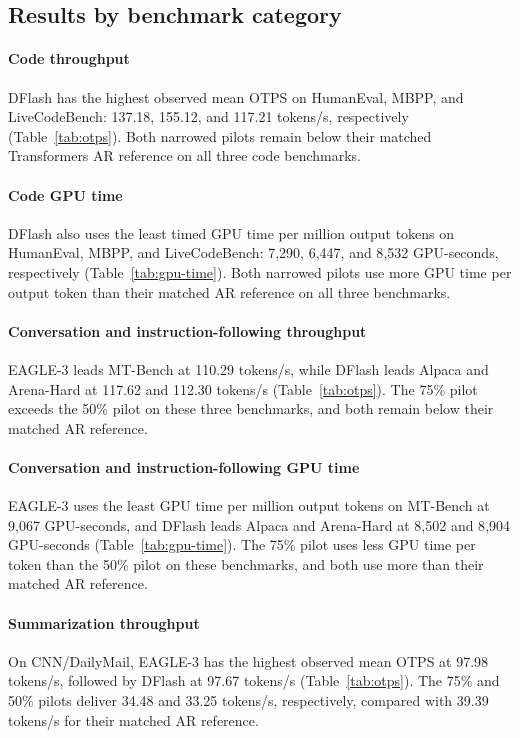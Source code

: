 \documentclass[conference,onecolumn]{IEEEtran}
\begin{document}
\subsection{Results by benchmark category}
\paragraph*{Code throughput}
DFlash has the highest observed mean OTPS on HumanEval, MBPP, and LiveCodeBench: 137.18, 155.12, and 117.21 tokens/s, respectively (Table~\ref{tab:otps}). Both narrowed pilots remain below their matched Transformers AR reference on all three code benchmarks.

\paragraph*{Code GPU time}
DFlash also uses the least timed GPU time per million output tokens on HumanEval, MBPP, and LiveCodeBench: 7{,}290, 6{,}447, and 8{,}532 GPU-seconds, respectively (Table~\ref{tab:gpu-time}). Both narrowed pilots use more GPU time per output token than their matched AR reference on all three benchmarks.

\paragraph*{Conversation and instruction-following throughput}
EAGLE-3 leads MT-Bench at 110.29 tokens/s, while DFlash leads Alpaca and Arena-Hard at 117.62 and 112.30 tokens/s (Table~\ref{tab:otps}). The 75\% pilot exceeds the 50\% pilot on these three benchmarks, and both remain below their matched AR reference.

\paragraph*{Conversation and instruction-following GPU time}
EAGLE-3 uses the least GPU time per million output tokens on MT-Bench at 9{,}067 GPU-seconds, and DFlash leads Alpaca and Arena-Hard at 8{,}502 and 8{,}904 GPU-seconds (Table~\ref{tab:gpu-time}). The 75\% pilot uses less GPU time per token than the 50\% pilot on these benchmarks, and both use more than their matched AR reference.

\paragraph*{Summarization throughput}
On CNN/DailyMail, EAGLE-3 has the highest observed mean OTPS at 97.98 tokens/s, followed by DFlash at 97.67 tokens/s (Table~\ref{tab:otps}). The 75\% and 50\% pilots deliver 34.48 and 33.25 tokens/s, respectively, compared with 39.39 tokens/s for their matched AR reference.
\end{document}
